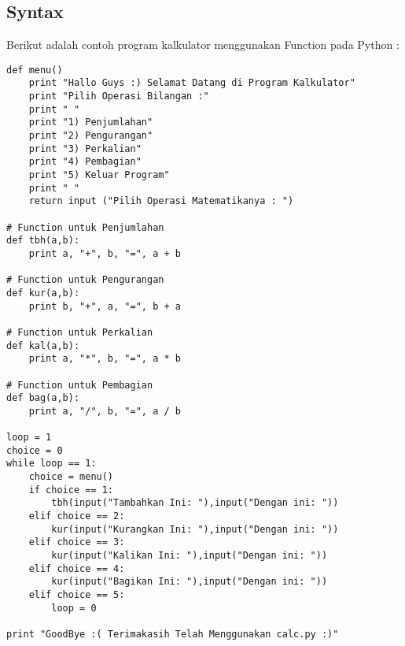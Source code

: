 \subsection{Syntax} \par
Berikut adalah contoh program kalkulator menggunakan Function pada Python : \par
\begin{verbatim}
def menu()
    print "Hallo Guys :) Selamat Datang di Program Kalkulator"
    print "Pilih Operasi Bilangan :"
    print " "
    print "1) Penjumlahan"
    print "2) Pengurangan"
    print "3) Perkalian"
    print "4) Pembagian"
    print "5) Keluar Program"
    print " "
    return input ("Pilih Operasi Matematikanya : ")

# Function untuk Penjumlahan
def tbh(a,b):
    print a, "+", b, "=", a + b

# Function untuk Pengurangan
def kur(a,b):
    print b, "+", a, "=", b + a

# Function untuk Perkalian
def kal(a,b):
    print a, "*", b, "=", a * b

# Function untuk Pembagian
def bag(a,b):
    print a, "/", b, "=", a / b

loop = 1
choice = 0
while loop == 1:
    choice = menu()
    if choice == 1:
        tbh(input("Tambahkan Ini: "),input("Dengan ini: "))
    elif choice == 2:
        kur(input("Kurangkan Ini: "),input("Dengan ini: "))
    elif choice == 3:
        kur(input("Kalikan Ini: "),input("Dengan ini: "))
    elif choice == 4:
        kur(input("Bagikan Ini: "),input("Dengan ini: "))
    elif choice == 5:
        loop = 0

print "GoodBye :( Terimakasih Telah Menggunakan calc.py :)"
\end{verbatim}

